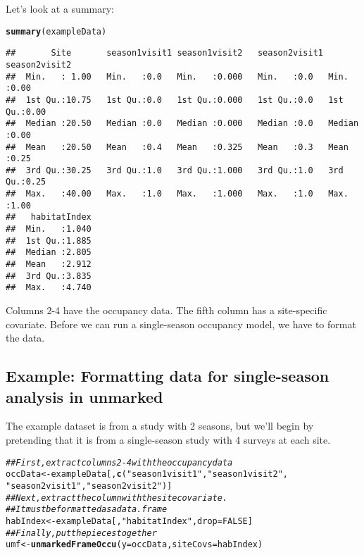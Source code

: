 \documentclass[12pt]{article}\usepackage[]{graphicx}\usepackage[]{color}
\makeatletter
\newcommand{\hlnum}[1]{\textcolor[rgb]{0.686,0.059,0.569}{#1}}%
\newcommand{\hlstr}[1]{\textcolor[rgb]{0.192,0.494,0.8}{#1}}%
\newcommand{\hlcom}[1]{\textcolor[rgb]{0.678,0.584,0.686}{\textit{#1}}}%
\newcommand{\hlstd}[1]{\textcolor[rgb]{0.345,0.345,0.345}{#1}}%
\newcommand{\hlkwb}[1]{\textcolor[rgb]{0.69,0.353,0.396}{#1}}%
\newcommand{\hlkwc}[1]{\textcolor[rgb]{0.333,0.667,0.333}{#1}}%
\newcommand{\hlkwd}[1]{\textcolor[rgb]{0.737,0.353,0.396}{\textbf{#1}}}%
\newenvironment{kframe}{%
 \def\at@end@of@kframe{}%
 \ifinner\ifhmode%
  \def\at@end@of@kframe{\end{minipage}}%
  \begin{minipage}{\columnwidth}%
 \fi\fi%
 \def\FrameCommand##1{\hskip\@totalleftmargin \hskip-\fboxsep
 \colorbox{shadecolor}{##1}\hskip-\fboxsep
     \hskip-\linewidth \hskip-\@totalleftmargin \hskip\columnwidth}%
 \MakeFramed {\advance\hsize-\width
   \@totalleftmargin\z@ \linewidth\hsize
   \@setminipage}}%
 {\par\unskip\endMakeFramed%
 \at@end@of@kframe}
\newenvironment{knitrout}{}{} %
\makeatother
\begin{document}
\newpage
Let's look at a summary:

\begin{knitrout}\footnotesize
{}\color{fgcolor}\begin{kframe}
\begin{alltt}
\hlkwd{summary}\hlstd{(exampleData)}
\end{alltt}
\begin{verbatim}
##       Site       season1visit1 season1visit2   season2visit1 season2visit2 
##  Min.   : 1.00   Min.   :0.0   Min.   :0.000   Min.   :0.0   Min.   :0.00  
##  1st Qu.:10.75   1st Qu.:0.0   1st Qu.:0.000   1st Qu.:0.0   1st Qu.:0.00  
##  Median :20.50   Median :0.0   Median :0.000   Median :0.0   Median :0.00  
##  Mean   :20.50   Mean   :0.4   Mean   :0.325   Mean   :0.3   Mean   :0.25  
##  3rd Qu.:30.25   3rd Qu.:1.0   3rd Qu.:1.000   3rd Qu.:1.0   3rd Qu.:0.25  
##  Max.   :40.00   Max.   :1.0   Max.   :1.000   Max.   :1.0   Max.   :1.00  
##   habitatIndex  
##  Min.   :1.040  
##  1st Qu.:1.885  
##  Median :2.805  
##  Mean   :2.912  
##  3rd Qu.:3.835  
##  Max.   :4.740
\end{verbatim}
\end{kframe}
\end{knitrout}

Columns 2-4 have the occupancy data. The fifth column has a
site-specific covariate. Before we can run a single-season occupancy
model, we have to format the data.




\subsection*{Example: Formatting data for single-season analysis in unmarked}


The example dataset is from a study with 2 seasons, but we'll begin by
pretending that it is from a single-season study with 4 surveys at
each site. 


\begin{knitrout}
\color{fgcolor}\begin{kframe}
\begin{alltt}
\hlcom{## First, extract columns 2-4 with the occupancy data}
\hlstd{occData} \hlkwb{<-} \hlstd{exampleData[,}\hlkwd{c}\hlstd{(}\hlstr{"season1visit1"}\hlstd{,} \hlstr{"season1visit2"}\hlstd{,}
                          \hlstr{"season2visit1"}\hlstd{,} \hlstr{"season2visit2"}\hlstd{)]}
\hlcom{## Next, extract the column with the site covariate.}
\hlcom{## It must be formatted as a data.frame}
\hlstd{habIndex} \hlkwb{<-} \hlstd{exampleData[,}\hlstr{"habitatIndex"}\hlstd{,}\hlkwc{drop}\hlstd{=}\hlnum{FALSE}\hlstd{]}
\hlcom{## Finally, put the pieces together}
\hlstd{umf} \hlkwb{<-} \hlkwd{unmarkedFrameOccu}\hlstd{(}\hlkwc{y}\hlstd{=occData,} \hlkwc{siteCovs}\hlstd{=habIndex)}
\end{alltt}
\end{kframe}
\end{knitrout}
\end{document}

